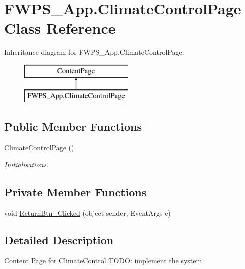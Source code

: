 \hypertarget{class_f_w_p_s___app_1_1_climate_control_page}{}\section{F\+W\+P\+S\+\_\+\+App.\+Climate\+Control\+Page Class Reference}
\label{class_f_w_p_s___app_1_1_climate_control_page}
Inheritance diagram for F\+W\+P\+S\+\_\+\+App.\+Climate\+Control\+Page\+:\begin{figure}[H]
\begin{center}
\leavevmode
\includegraphics[height=2.000000cm]{class_f_w_p_s___app_1_1_climate_control_page}
\end{center}
\end{figure}
\subsection*{Public Member Functions}
\begin{DoxyCompactItemize}
\item 
\mbox{\hyperlink{class_f_w_p_s___app_1_1_climate_control_page_aba12b402f7caf52fce62aa9cc2e6cf6f}{Climate\+Control\+Page}} ()
\begin{DoxyCompactList}\small\item\em Initialisations. \end{DoxyCompactList}\end{DoxyCompactItemize}
\subsection*{Private Member Functions}
\begin{DoxyCompactItemize}
\item 
void \mbox{\hyperlink{class_f_w_p_s___app_1_1_climate_control_page_a742b4770975ad02491e33460e00d1b1e}{Return\+Btn\+\_\+\+Clicked}} (object sender, Event\+Args e)
\end{DoxyCompactItemize}


\subsection{Detailed Description}
Content Page for Climate\+Control T\+O\+DO\+: implement the system 

